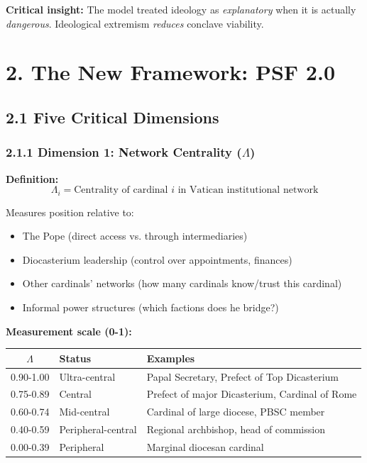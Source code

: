 \documentclass[11pt]{article}
\begin{document}
\textbf{Critical insight:} The model treated ideology as \textit{explanatory} when it is actually \textit{dangerous}. Ideological extremism \textit{reduces} conclave viability.

\section{2. The New Framework: PSF 2.0}

\subsection{2.1 Five Critical Dimensions}

\subsubsection{2.1.1 Dimension 1: Network Centrality ($\Lambda$)}

\textbf{Definition:}
$$\Lambda_i = \text{Centrality of cardinal } i \text{ in Vatican institutional network}$$

Measures position relative to:
\begin{itemize}
\item The Pope (direct access vs. through intermediaries)
\item Diocasterium leadership (control over appointments, finances)
\item Other cardinals' networks (how many cardinals know/trust this cardinal)
\item Informal power structures (which factions does he bridge?)
\end{itemize}

\textbf{Measurement scale (0-1):}

\begin{table}[h]
\centering
\begin{tabular}{|c|l|l|}
\hline
$\Lambda$ & \textbf{Status} & \textbf{Examples} \\
\hline
0.90-1.00 & Ultra-central & Papal Secretary, Prefect of Top Dicasterium \\
0.75-0.89 & Central & Prefect of major Dicasterium, Cardinal of Rome \\
0.60-0.74 & Mid-central & Cardinal of large diocese, PBSC member \\
0.40-0.59 & Peripheral-central & Regional archbishop, head of commission \\
0.00-0.39 & Peripheral & Marginal diocesan cardinal \\
\hline
\end{tabular}
\end{table}
\end{document}
